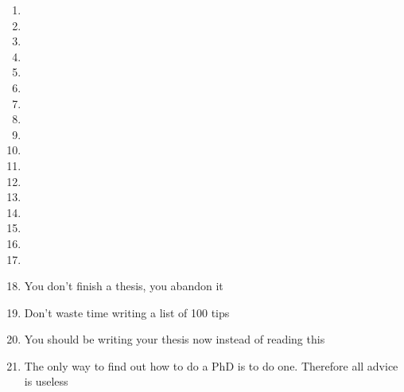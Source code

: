 \begin{enumerate}
	\item
	\item
	\item
	\item
	\item
	\item
	\item
	\item
	\item
	\item
	\item
	\item
	\item
	\item
	\item
	\item
	\item
	\item You don't finish a thesis, you abandon it 
	\item Don't waste time writing a list of 100 tips
	\item You should be writing your thesis now instead of reading this
	\item The only way to find out how to do a PhD is to do one. Therefore all advice is useless\cite{richardbutterworth}
\end{enumerate}